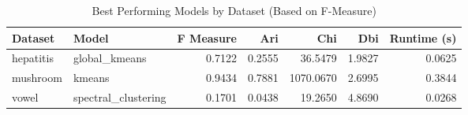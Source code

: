 \begin{table*}[ht!]
\caption{Best Performing Models by Dataset (Based on F-Measure)}
\label{tab:best_models_overall}
\begin{tabular}{llrrrrr}
Dataset & Model & F Measure & Ari & Chi & Dbi & Runtime (s) \\\midrule

hepatitis & global\_kmeans & 0.7122 & 0.2555 & 36.5479 & 1.9827 & 0.0625 \\
mushroom & kmeans & 0.9434 & 0.7881 & 1070.0670 & 2.6995 & 0.3844 \\
vowel & spectral\_clustering & 0.1701 & 0.0438 & 19.2650 & 4.8690 & 0.0268 \\
\end{tabular}
\end{table*}
